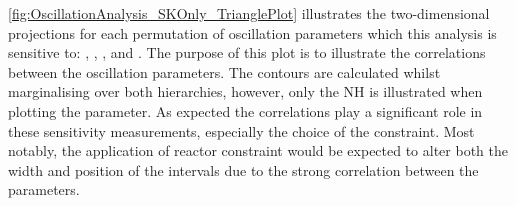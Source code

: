 \autoref{fig:OscillationAnalysis_SKOnly_TrianglePlot} illustrates the two-dimensional projections for each permutation of oscillation parameters which this analysis is sensitive to: , , , and . The purpose of this plot is to illustrate the correlations between the oscillation parameters. The contours are calculated whilst marginalising over both hierarchies, however, only the NH is illustrated when plotting the  parameter. As expected the correlations play a significant role in these sensitivity measurements, especially the choice of the  constraint. Most notably, the application of reactor constraint would be expected to alter both the width and position of the  intervals due to the strong correlation between the parameters.


